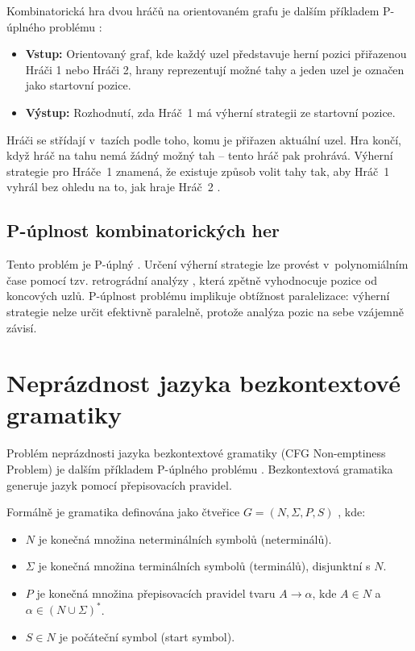 Kombinatorická hra dvou hráčů na orientovaném grafu je dalším příkladem P-úplného problému \cite{sawa}:

\begin{itemize}
    \item \textbf{Vstup:} Orientovaný graf, kde každý uzel představuje herní pozici přiřazenou Hráči 1 nebo Hráči 2, hrany reprezentují možné tahy a jeden uzel je označen jako startovní pozice.
    \item \textbf{Výstup:} Rozhodnutí, zda Hráč~1 má výherní strategii ze startovní pozice.
\end{itemize}

Hráči se střídají v~tazích podle toho, komu je přiřazen aktuální uzel. Hra končí, když hráč na tahu nemá žádný možný tah – tento hráč pak prohrává. Výherní strategie pro Hráče~1 znamená, že existuje způsob volit tahy tak, aby Hráč~1 vyhrál bez ohledu na to, jak hraje Hráč~2 \cite{sawa}.

\subsection{P-úplnost kombinatorických her}
\label{sec:GamesTheoryCompleteness}

Tento problém je P-úplný \cite{sawa, miyano}. Určení výherní strategie lze provést v~polynomiálním čase pomocí tzv. retrográdní analýzy \cite{sawa}, která zpětně vyhodnocuje pozice od koncových uzlů. P-úplnost problému implikuje obtížnost paralelizace: výherní strategie nelze určit efektivně paralelně, protože analýza pozic na sebe vzájemně závisí.

\section{Neprázdnost jazyka bezkontextové gramatiky}
\label{sec:TheoryGrammars}

Problém neprázdnosti jazyka bezkontextové gramatiky (CFG Non-emptiness Problem) je dalším příkladem P-úplného problému \cite{sawa}. Bezkontextová gramatika generuje jazyk pomocí přepisovacích pravidel.

Formálně je gramatika definována jako čtveřice \( G = (N, \Sigma, P, S) \) \cite{uti_grammars}, kde:

\begin{itemize}
    \item \( N \) je konečná množina neterminálních symbolů (neterminálů).
    \item \( \Sigma \) je konečná množina terminálních symbolů (terminálů), disjunktní s \( N \).
    \item \( P \) je konečná množina přepisovacích pravidel tvaru \( A \to \alpha \), kde \( A \in N \) a \( \alpha \in (N \cup \Sigma)^* \).
    \item \( S \in N \) je počáteční symbol (start symbol).
\end{itemize}

